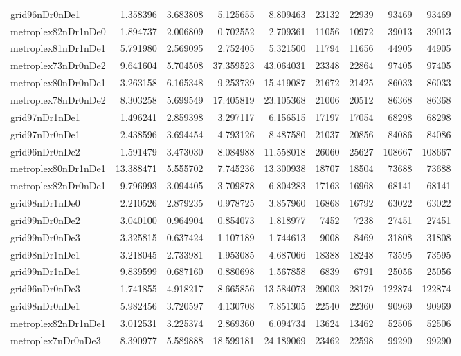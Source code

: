 \begin{longtable}{|l|r|r|r|r|r|r|r|r|}
grid96nDr0nDe1 & 1.358396 & 3.683808 & 5.125655 & 8.809463 & 23132 & 22939 & 93469 & 93469 \\
metroplex82nDr1nDe0 & 1.894737 & 2.006809 & 0.702552 & 2.709361 & 11056 & 10972 & 39013 & 39013 \\
metroplex81nDr1nDe1 & 5.791980 & 2.569095 & 2.752405 & 5.321500 & 11794 & 11656 & 44905 & 44905 \\
metroplex73nDr0nDe2 & 9.641604 & 5.704508 & 37.359523 & 43.064031 & 23348 & 22864 & 97405 & 97405 \\
metroplex80nDr0nDe1 & 3.263158 & 6.165348 & 9.253739 & 15.419087 & 21672 & 21425 & 86033 & 86033 \\
metroplex78nDr0nDe2 & 8.303258 & 5.699549 & 17.405819 & 23.105368 & 21006 & 20512 & 86368 & 86368 \\
grid97nDr1nDe1 & 1.496241 & 2.859398 & 3.297117 & 6.156515 & 17197 & 17054 & 68298 & 68298 \\
grid97nDr0nDe1 & 2.438596 & 3.694454 & 4.793126 & 8.487580 & 21037 & 20856 & 84086 & 84086 \\
grid96nDr0nDe2 & 1.591479 & 3.473030 & 8.084988 & 11.558018 & 26060 & 25627 & 108667 & 108667 \\
metroplex80nDr1nDe1 & 13.388471 & 5.555702 & 7.745236 & 13.300938 & 18707 & 18504 & 73688 & 73688 \\
metroplex82nDr0nDe1 & 9.796993 & 3.094405 & 3.709878 & 6.804283 & 17163 & 16968 & 68141 & 68141 \\
grid98nDr1nDe0 & 2.210526 & 2.879235 & 0.978725 & 3.857960 & 16868 & 16792 & 63022 & 63022 \\
grid99nDr0nDe2 & 3.040100 & 0.964904 & 0.854073 & 1.818977 & 7452 & 7238 & 27451 & 27451 \\
grid99nDr0nDe3 & 3.325815 & 0.637424 & 1.107189 & 1.744613 & 9008 & 8469 & 31808 & 31808 \\
grid98nDr1nDe1 & 3.218045 & 2.733981 & 1.953085 & 4.687066 & 18388 & 18248 & 73595 & 73595 \\
grid99nDr1nDe1 & 9.839599 & 0.687160 & 0.880698 & 1.567858 & 6839 & 6791 & 25056 & 25056 \\
grid96nDr0nDe3 & 1.741855 & 4.918217 & 8.665856 & 13.584073 & 29003 & 28179 & 122874 & 122874 \\
grid98nDr0nDe1 & 5.982456 & 3.720597 & 4.130708 & 7.851305 & 22540 & 22360 & 90969 & 90969 \\
metroplex82nDr1nDe1 & 3.012531 & 3.225374 & 2.869360 & 6.094734 & 13624 & 13462 & 52506 & 52506 \\
metroplex7nDr0nDe3 & 8.390977 & 5.589888 & 18.599181 & 24.189069 & 23462 & 22598 & 99290 & 99290 \\

\end{longtable}
